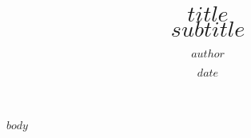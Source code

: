 \documentclass[12pt, a4paper, $lang$]{article}
\begin{document}
\title{{\Huge\bfseries $title$} \\
  \textit{$subtitle$}}
\author{\textsc{$author$}}
\date{$date$}
\maketitle

\pagestyle{fancy}
\renewcommand{\headrulewidth}{0.6pt}
\renewcommand{\footrulewidth}{0.6pt}

$body$
\end{document}
